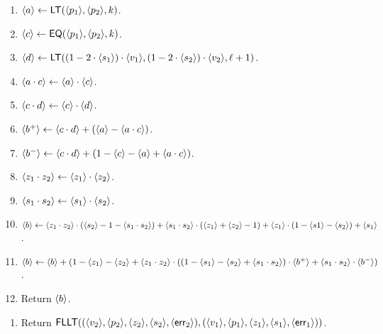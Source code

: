\begin{enumerate}
\item $\langle a \rangle \leftarrow \mathsf{LT}(\langle p_1 \rangle,\langle p_2 \rangle,k)$.
\item $\langle c \rangle \leftarrow \mathsf{EQ}(\langle p_1 \rangle,\langle p_2 \rangle,k)$.
\item $\langle d \rangle \leftarrow \mathsf{LT}((1-2\cdot \langle s_1 \rangle) \cdot \langle v_1 \rangle,
	                           (1-2\cdot \langle s_2 \rangle) \cdot \langle v_2 \rangle,\ell+1)$.
\item $\langle a \cdot c \rangle \leftarrow \langle a \rangle\cdot \langle c \rangle$.
\item $\langle c \cdot d \rangle \leftarrow \langle c \rangle\cdot \langle d \rangle$.
\item $\langle b^+ \rangle \leftarrow \langle c \cdot d \rangle+(\langle a \rangle-\langle a \cdot c \rangle)$.
\item $\langle b^- \rangle \leftarrow \langle c \cdot d \rangle+(1-\langle c \rangle-\langle a \rangle+\langle a \cdot c \rangle)$.
\item $\langle z_1 \cdot z_2 \rangle \leftarrow \langle z_1 \rangle\cdot \langle z_2 \rangle$.
\item $\langle s_1 \cdot s_2 \rangle \leftarrow \langle s_1 \rangle\cdot \langle s_2 \rangle$.
\item $\langle b \rangle \leftarrow \langle z_1 \cdot z_2 \rangle \cdot (\langle s_2 \rangle-1-\langle s_1 \cdot s_2 \rangle)
	             + \langle s_1 \cdot s_2 \rangle \cdot (\langle z_1 \rangle+\langle z_2 \rangle-1)
		     + \langle z_1 \rangle\cdot (1-\langle s1 \rangle-\langle s_2 \rangle)
		     + \langle s_1 \rangle$.
\item $\langle b \rangle \leftarrow \langle b \rangle+
	(1-\langle z_1 \rangle-\langle z_2 \rangle+\langle z_1 \cdot z_2 \rangle \cdot 
	((1-\langle s_1 \rangle-\langle s_2 \rangle+\langle s_1 \cdot s_2 \rangle) \cdot \langle b^+ \rangle
	+\langle s_1 \cdot s_2 \rangle \cdot \langle b^- \rangle)$.
\item Return $\langle b \rangle$.
\end{enumerate}


\begin{enumerate}
\item Return $\mathsf{FLLT}(
	(\langle v_2 \rangle,\langle p_2 \rangle,\langle z_2 \rangle,\langle s_2 \rangle,\langle \mathsf{err}_2 \rangle),
        (\langle v_1 \rangle,\langle p_1 \rangle,\langle z_1 \rangle,\langle s_1 \rangle,\langle \mathsf{err}_1 \rangle))$.
\end{enumerate}

